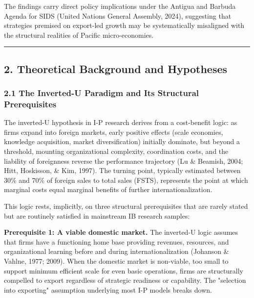 \documentclass[12pt,a4paper]{article}
\begin{document}
The findings carry direct policy implications under the Antigua and
Barbuda Agenda for SIDS (United Nations General Assembly, 2024),
suggesting that strategies premised on export-led growth may be
systematically misaligned with the structural realities of Pacific
micro-economies.

\begin{center}\rule{0.5\linewidth}{0.5pt}\end{center}

\hypertarget{2-theoretical-background-and-hypotheses}{%
\subsection{2. Theoretical Background and
Hypotheses}\label{2-theoretical-background-and-hypotheses}}

\hypertarget{21-the-inverted-u-paradigm-and-its-structural-prerequisites}{%
\subsubsection{2.1 The Inverted-U Paradigm and Its Structural
Prerequisites}\label{21-the-inverted-u-paradigm-and-its-structural-prerequisites}}

The inverted-U hypothesis in I-P research derives from a cost-benefit
logic: as firms expand into foreign markets, early positive effects
(scale economies, knowledge acquisition, market diversification)
initially dominate, but beyond a threshold, mounting organizational
complexity, coordination costs, and the liability of foreignness reverse
the performance trajectory (Lu \& Beamish, 2004; Hitt, Hoskisson, \&
Kim, 1997). The turning point, typically estimated between 30\% and 70\%
of foreign sales to total sales (FSTS), represents the point at which
marginal costs equal marginal benefits of further internationalization.

This logic rests, implicitly, on three structural prerequisites that are
rarely stated but are routinely satisfied in mainstream IB research
samples:

\textbf{Prerequisite 1: A viable domestic market.} The inverted-U logic
assumes that firms have a functioning home base providing revenues,
resources, and organizational learning before and during
internationalization (Johanson \& Vahlne, 1977; 2009). When the domestic
market is non-viable, too small to support minimum efficient scale for
even basic operations, firms are structurally compelled to export
regardless of strategic readiness or capability. The "selection into
exporting" assumption underlying most I-P models breaks down.
\end{document}
